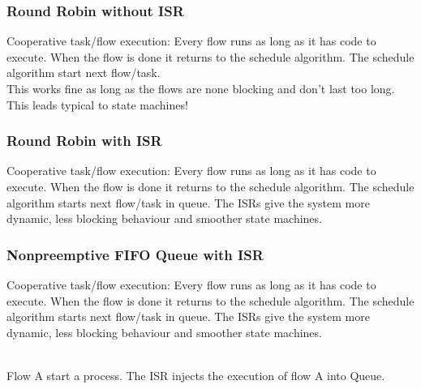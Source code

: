 \subsubsection{Round Robin without ISR}
\begin{paracol}{2}
  Cooperative task/flow execution: Every flow runs as long as it has code to execute.
  When the flow is done it returns to the schedule algorithm.
  The schedule algorithm start next flow/task.\\
  This works fine as long as the flows are none blocking and don’t last too long.
  This leads typical to state machines!\\
  $ $\\
  \switchcolumn
  
\end{paracol}

\subsubsection{Round Robin with ISR}
Cooperative task/flow execution: Every flow runs as long as it has code to execute.
When the flow is done it returns to the schedule algorithm.
The schedule algorithm starts next flow/task in queue.
The ISRs give the system more dynamic, less blocking behaviour and smoother state machines.
\begin{paracol}{2}
  
  \switchcolumn
  
\end{paracol}


\subsubsection{Nonpreemptive FIFO Queue with ISR}
Cooperative task/flow execution: Every flow runs as long as it has code to execute. When the flow is
done it returns to the schedule algorithm. The schedule algorithm starts next flow/task in queue.
The ISRs give the system more dynamic, less blocking behaviour and smoother state machines.
\begin{paracol}{3}
  
  \switchcolumn
  
  \switchcolumn
  
\end{paracol}
\\
Flow A start a process.
The ISR injects the execution of flow A into Queue.

